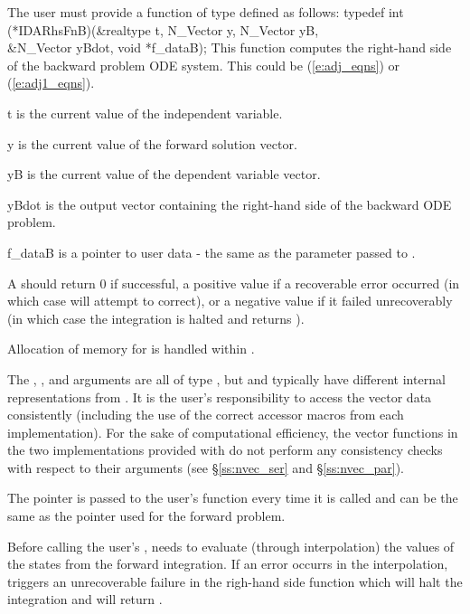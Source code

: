 The user must provide a function of type  defined as follows:
{
  typedef int (*IDARhsFnB)(&realtype t, N\_Vector y, N\_Vector yB, \\
                          &N\_Vector yBdot, void *f\_dataB);
}
{
  This function computes the right-hand side of the backward problem ODE system.
  This could be (\ref{e:adj_eqns}) or (\ref{e:adj1_eqns}).
}
{
  \begin{args}[f\_dataB]
  \item[t]
    is the current value of the independent variable.
  \item[y]
    is the current value of the forward solution vector.
  \item[yB]
    is the current value of the dependent variable vector.
  \item[yBdot]
    is the output vector containing the right-hand side of the backward ODE problem.
  \item[f\_dataB]
    is a pointer to user data - the same as the       
    parameter passed to .   
  \end{args}
}
{
  A  should return 0 if successful, a positive value if a recoverable
  error occurred (in which case {\idas} will attempt to correct), or a negative 
  value if it failed unrecoverably (in which case the integration is halted and
   returns ).
}
{
  Allocation of memory for  is handled within {\idas}.

  The , , and  arguments are all of type ,
  but  and   typically have different internal representations
  from . It is the user's 
  responsibility to access the vector data consistently (including the use of the 
  correct accessor macros from each {\nvector} implementation). For the sake of 
  computational efficiency, the vector functions in the two {\nvector} implementations 
  provided with {\idas} do not perform any consistency checks with respect to their 
   arguments (see \S\ref{ss:nvec_ser} and \S\ref{ss:nvec_par}).

  The  pointer is passed to 
  the user's  function every time it is called and can be the same as the 
   pointer used for the forward problem.

  {\warn}Before calling the user's , {\idaa} needs to evaluate
  (through interpolation) the values of the states from the forward integration. 
  If an error occurrs in the interpolation, {\idaa} triggers an unrecoverable
  failure in the righ-hand side function which will halt the integration and
   will return .
}


